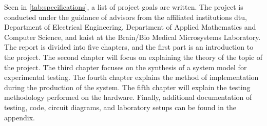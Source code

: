 Seen in \cref{tab:specifications}, a list of project goals are written. The project is conducted under the guidance of advisors from the affiliated institutions \Gls{dtu}, Department of Electrical Engineering, Department of Applied Mathematics and Computer Science, and \Gls{kaist} at the Brain/Bio Medical Microsystems Laboratory. The report is divided into five chapters, and the first part is an introduction to the project. The second chapter will focus on explaining the theory of the topic of the project. The third chapter focuses on the synthesis of a system model for experimental testing. The fourth chapter explains the method of implementation during the production of the system. The fifth chapter will explain the testing methodology performed on the hardware. Finally, additional documentation of testing, code, circuit diagrams, and laboratory setups can be found in the appendix.